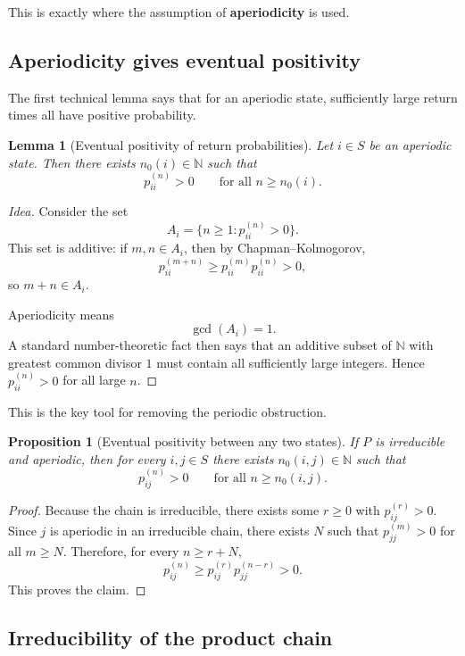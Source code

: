 \documentclass[11pt]{article}
\newtheorem{proposition}[theorem]{Proposition}
\newtheorem{lemma}[theorem]{Lemma}
\theoremstyle{definition}
\begin{document}
This is exactly where the assumption of \textbf{aperiodicity} is used.

\subsection{Aperiodicity gives eventual positivity}

The first technical lemma says that for an aperiodic state, sufficiently large return times all have positive probability.

\begin{lemma}[Eventual positivity of return probabilities]
Let \(i\in S\) be an aperiodic state. Then there exists \(n_0(i)\in\mathbb N\) such that
\[
p_{ii}^{(n)}>0
\qquad \text{for all } n\ge n_0(i).
\]
\end{lemma}

\begin{proof}[Idea]
Consider the set
\[
A_i = \{n\ge 1 : p_{ii}^{(n)}>0\}.
\]
This set is additive: if \(m,n\in A_i\), then by Chapman--Kolmogorov,
\[
p_{ii}^{(m+n)}
\ge
p_{ii}^{(m)}p_{ii}^{(n)}
>0,
\]
so \(m+n\in A_i\).

Aperiodicity means
\[
\gcd(A_i)=1.
\]
A standard number-theoretic fact then says that an additive subset of \(\mathbb N\) with greatest common divisor \(1\) must contain all sufficiently large integers. Hence \(p_{ii}^{(n)}>0\) for all large \(n\).
\end{proof}

This is the key tool for removing the periodic obstruction.

\begin{proposition}[Eventual positivity between any two states]
If \(P\) is irreducible and aperiodic, then for every \(i,j\in S\) there exists \(n_0(i,j)\in\mathbb N\) such that
\[
p_{ij}^{(n)}>0
\qquad \text{for all } n\ge n_0(i,j).
\]
\end{proposition}

\begin{proof}
Because the chain is irreducible, there exists some \(r\ge 0\) with \(p_{ij}^{(r)}>0\). Since \(j\) is aperiodic in an irreducible chain, there exists \(N\) such that \(p_{jj}^{(m)}>0\) for all \(m\ge N\). Therefore, for every \(n\ge r+N\),
\[
p_{ij}^{(n)}
\ge
p_{ij}^{(r)}p_{jj}^{(n-r)}
>0.
\]
This proves the claim.
\end{proof}

\subsection{Irreducibility of the product chain}
\end{document}
